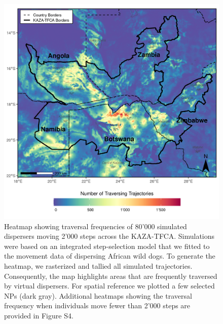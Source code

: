 \documentclass[abstract=on,10pt,a4paper,bibliography=totocnumbered]{article}
\begin{document}
\begin{figure}
  \includegraphics[width=\textwidth]{99_Heatmap.png}
  \caption{Heatmap showing traversal frequencies of 80'000 simulated dispersers
  moving 2'000 steps across the KAZA-TFCA. Simulations were based on an
  integrated step-selection model that we fitted to the movement data of
  dispersing African wild dogs. To generate the heatmap, we rasterized and
  tallied all simulated trajectories. Consequently, the map highlights areas
  that are frequently traversed by virtual dispersers. For spatial reference we
  plotted a few selected NPs (dark gray). Additional heatmaps showing the
  traversal frequency when individuals move fewer than 2'000 steps are provided
  in Figure S4.}
  \label{Heatmap}
\end{figure}
\end{document}
